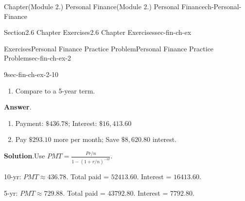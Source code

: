 \documentclass[oneside,10pt,]{book}
\newcommand{\blocktitlefont}{\relax}
\begin{document}
\begin{chapterptx}{Chapter}{(Module 2.) Personal Finance}{}{(Module 2.) Personal Finance}{}{}{ch-Personal-Finance}
\begin{sectionptx}{Section}{2.6 Chapter Exercises}{}{2.6 Chapter Exercises}{}{}{sec-fin-ch-ex}
\begin{exercises-subsection-numberless}{Exercises}{Personal Finance Practice Problem}{}{Personal Finance Practice Problem}{}{}{sec-fin-ch-ex-2}
\begin{divisionexercise}{9}{}{}{sec-fin-ch-ex-2-10}
\begin{enumerate}[label={\alph*}]
\item{}Compare to a 5-year term.%
\end{enumerate}
%
\par\smallskip%
\noindent\textbf{\blocktitlefont Answer}.\hypertarget{sec-fin-ch-ex-2-10-2}{}\quad{}%
\begin{enumerate}[label={\alph*}]
\item{}Payment: \(\$436.78\); Interest: \(\$16,413.60\)%
\item{}Pay \(\$293.10\) more per month; Save \(\$8,620.80\) interest.%
\end{enumerate}
%
\par\smallskip%
\noindent\textbf{\blocktitlefont Solution}.\hypertarget{sec-fin-ch-ex-2-10-3}{}\quad{}Use \(PMT = \frac{Pr/n}{1-(1+r/n)^{-nt}}\).%
\par
10-yr: \(PMT \approx 436.78\). Total paid = \(52413.60\). Interest = \(16413.60\).%
\par
5-yr: \(PMT \approx 729.88\). Total paid = \(43792.80\). Interest = \(7792.80\).%
\end{divisionexercise}%
\end{exercises-subsection-numberless}
\end{sectionptx}
\end{chapterptx}
%
%
\typeout{************************************************}
\typeout{************************************************}
%
\end{document}
